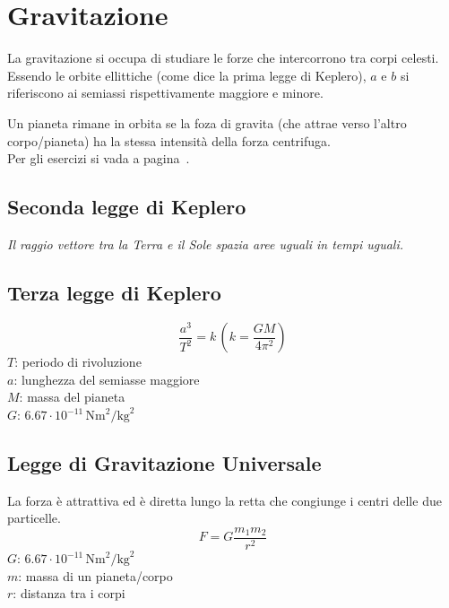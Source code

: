 
\section{Gravitazione}\label{sec:gravitazione}
La gravitazione si occupa di studiare le forze che intercorrono tra corpi celesti.\\ 
Essendo le orbite ellittiche (come dice la prima legge di Keplero), $a$ e $b$ si riferiscono ai 
semiassi rispettivamente maggiore e minore.
\begin{center}
\end{center}
Un pianeta rimane in orbita se la foza di gravita (che attrae verso l'altro corpo/pianeta) ha la 
stessa intensità della forza centrifuga.\\
Per gli esercizi si vada a pagina~\pageref{ex:gravitazione}.

\subsection{Seconda legge di Keplero}
\textit{Il raggio vettore tra la Terra e il Sole spazia aree uguali in tempi uguali.}

\subsection{Terza legge di Keplero}
\begin{equation*}
\frac{a^3}{T^2} = k\,\left(k = \frac{GM}{4\pi^2}\right)
\end{equation*}
$T$: periodo di rivoluzione\\
$a$: lunghezza del semiasse maggiore\\
$M$: massa del pianeta\\
\hyperref[tab:G]{$G$}: $6.67\cdot10^{-11}\,\text{Nm}^2\text{/kg}^2$

\subsection{Legge di Gravitazione Universale}
La forza è attrattiva ed è diretta lungo la retta che congiunge i centri delle due particelle.
\begin{equation*}
F = G\frac{m_1m_2}{r^2}
\end{equation*}
\hyperref[tab:G]{$G$}: $6.67\cdot10^{-11}\,\text{Nm}^2\text{/kg}^2$\\
$m$: massa di un pianeta/corpo\\
$r$: distanza tra i corpi

